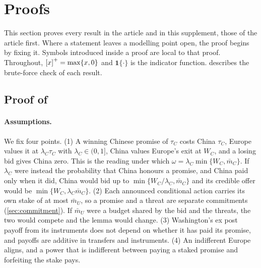 \section{Proofs}\label{app:proofs}

This section proves every result in the article and in this supplement, those of the article first. Where a statement leaves a modelling point open, the proof begins by fixing it. Symbols introduced inside a proof are local to that proof. Throughout, $\left[x\right]^{+}=\max\{x,0\}$ and $\mathbf 1\{\cdot\}$ is the indicator function.  describes the brute-force check of each result.

\subsection{Proof of \texorpdfstring{}{the bidding benchmark}}

\paragraph{Assumptions.} We fix four points. (1) A winning Chinese promise of $\tau_C$ costs China $\tau_C$, Europe values it at $\lambda_C\tau_C$ with $\lambda_C\in(0,1]$, China values Europe's exit at $W_C$, and a losing bid gives China zero. This is the reading under which $\omega=\lambda_C\min\{W_C,\bar m_C\}$. If $\lambda_C$ were instead the probability that China honours a promise, and China paid only when it did, China would bid up to $\min\{W_C/\lambda_C,\bar m_C\}$ and its credible offer would be $\min\{W_C,\lambda_C\bar m_C\}$. (2) Each announced conditional action carries its own stake of at most $\bar m_U$, so a promise and a threat are separate commitments (\cref{sec:commitment}). If $\bar m_U$ were a budget shared by the bid and the threats, the two would compete and the lemma would change. (3) Washington's ex post payoff from its instruments does not depend on whether it has paid its promise, and payoffs are additive in transfers and instruments. (4) An indifferent Europe aligns, and a power that is indifferent between paying a staked promise and forfeiting the stake pays.

